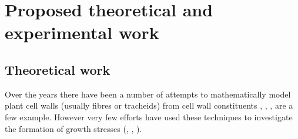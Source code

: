 \chapter{Proposed theoretical and experimental work}
\section{Theoretical work}
Over the years there have been a number of attempts to mathematically model plant
cell walls (usually fibres or tracheids) from cell wall constituents \cite{mark1967cell}, \cite{Astley_1998}, \cite{Yamamoto_2002}, \cite{Kojima_2004} are a few example. However very few efforts have used these
techniques to investigate the formation of growth stresses (\cite{Archer_1987},
\cite{Yamamoto_1998}, \cite{Guitard_1999}).